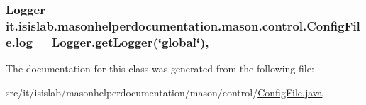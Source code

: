 \hypertarget{classit_1_1isislab_1_1masonhelperdocumentation_1_1mason_1_1control_1_1_config_file_a1e0cc7c39d846dcf3dd9def42f836e89}{
\subsubsection[{log}]{\setlength{\rightskip}{0pt plus 5cm}Logger it.\-isislab.\-masonhelperdocumentation.\-mason.\-control.\-Config\-File.\-log = Logger.\-get\-Logger(\char`\"{}global\char`\"{})\hspace{0.3cm}{\ttfamily [static]}, {\ttfamily [private]}}}\label{classit_1_1isislab_1_1masonhelperdocumentation_1_1mason_1_1control_1_1_config_file_a1e0cc7c39d846dcf3dd9def42f836e89}


The documentation for this class was generated from the following file\-:\begin{DoxyCompactItemize}
\item 
src/it/isislab/masonhelperdocumentation/mason/control/\hyperlink{_config_file_8java}{Config\-File.\-java}\end{DoxyCompactItemize}
